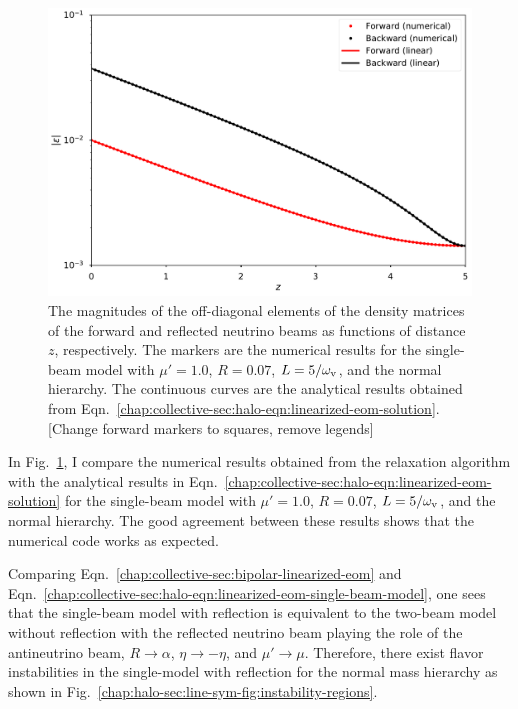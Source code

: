 \begin{figure}[htbp]
    \centering
    \includegraphics[width=\textwidth]{chapters/assets/halo/thesis-mu-1-refl-0p07}
    \caption{The magnitudes of the off-diagonal elements of the density matrices of the forward and reflected neutrino beams as functions of distance $z$, respectively. The markers are the numerical results for the single-beam model with $\mu'= 1.0$, $R=0.07$, $L=5/\omega_\mathrm v$, and the normal hierarchy. The continuous curves are the analytical results obtained from Eqn.~\eqref{chap:collective-sec:halo-eqn:linearized-eom-solution}. [Change forward markers to squares, remove legends]}
    \label{chap:halo-sec:line-sym-fig:mu-1.0-reflection-0.07}
\end{figure}

In Fig.~\ref{chap:halo-sec:line-sym-fig:mu-1.0-reflection-0.07}, I compare the numerical results obtained from the relaxation algorithm with the analytical results in Eqn.~\eqref{chap:collective-sec:halo-eqn:linearized-eom-solution} for the single-beam model with $\mu'= 1.0$, $R=0.07$, $L=5/\omega_\mathrm v$, and the normal hierarchy. The good agreement between these results shows that the numerical code works as expected.

Comparing Eqn.~\eqref{chap:collective-sec:bipolar-linearized-eom} and Eqn.~\eqref{chap:collective-sec:halo-eqn:linearized-eom-single-beam-model}, one sees that the single-beam model with reflection is equivalent to the two-beam model without reflection with the reflected neutrino beam playing the role of the antineutrino beam, $R\to \alpha$, $\eta \to -\eta$, and $\mu' \to \mu$. Therefore, there exist flavor instabilities in the single-model with reflection for the normal mass hierarchy as shown in Fig.~\ref{chap:halo-sec:line-sym-fig:instability-regions}.

